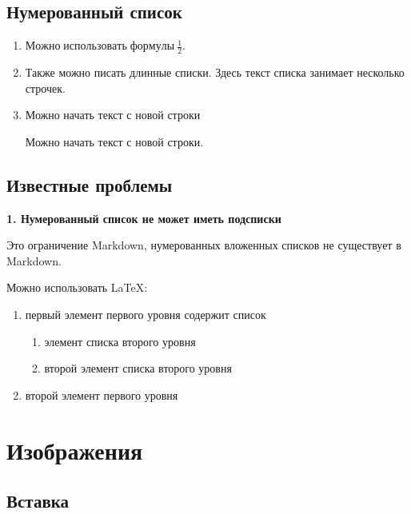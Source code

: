 \documentclass[a4paper]{article}
\begin{document}
\subsection{Нумерованный
список}\label{ux43dux443ux43cux435ux440ux43eux432ux430ux43dux43dux44bux439-ux441ux43fux438ux441ux43eux43a}

\begin{enumerate}
\def\labelenumi{\arabic{enumi}.}
\item
  \(\mathit{Можно}\;\mathit{использовать}\;\mathit{формулы}\:\frac{1}{2}\).
\item
  Также можно писать длинные списки. Здесь текст списка занимает
  несколько строчек.
\item
  Можно начать текст с новой строки

  Можно начать текст с новой строки.
\end{enumerate}

\subsection{Известные
проблемы}\label{ux438ux437ux432ux435ux441ux442ux43dux44bux435-ux43fux440ux43eux431ux43bux435ux43cux44b-2}

\textbf{1. Нумерованный список не может иметь подсписки}

Это ограничение Markdown, нумерованных вложенных списков не существует в
Markdown.

Можно использовать \LaTeX:

\begin{enumerate}
\item первый элемент первого уровня содержит список
\begin{enumerate}
\item элемент списка второго уровня
\item второй элемент списка второго уровня
\end{enumerate}
\item второй элемент первого уровня
\end{enumerate}

\section{Изображения}\label{ux438ux437ux43eux431ux440ux430ux436ux435ux43dux438ux44f}

\subsection{Вставка}\label{ux432ux441ux442ux430ux432ux43aux430}
\end{document}
